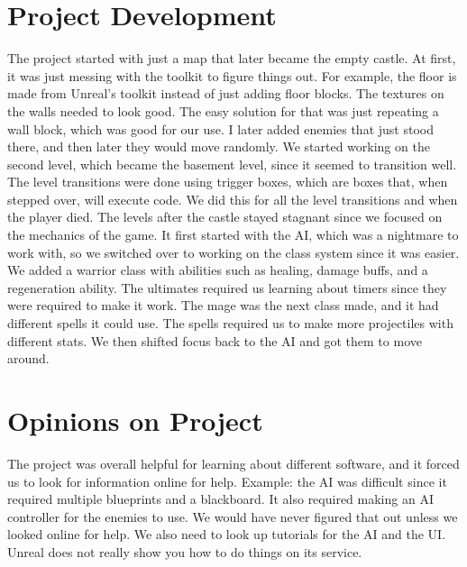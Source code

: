 \documentclass{sigchi}
\begin{document}
\section{Project Development}
The project started with just a map that later became the empty castle. At first, it was just messing with the toolkit to figure things out. For example, the floor is made from Unreal's toolkit instead of just adding floor blocks. The textures on the walls needed to look good. The easy solution for that was just repeating a wall block, which was good for our use. I later added enemies that just stood there, and then later they would move randomly. We started working on the second level, which became the basement level, since it seemed to transition well. The level transitions were done using trigger boxes, which are boxes that, when stepped over, will execute code. We did this for all the level transitions and when the player died. The levels after the castle stayed stagnant since we focused on the mechanics of the game. It first started with the AI, which was a nightmare to work with, so we switched over to working on the class system since it was easier. We added a warrior class with abilities such as healing, damage buffs, and a regeneration ability. The ultimates required us learning about timers since they were required to make it work. The mage was the next class made, and it had different spells it could use. The spells required us to make more projectiles with different stats. We then shifted focus back to the AI and got them to move around.


\section{Opinions on Project}
The project was overall helpful for learning about different software, and it forced us to look for information online for help. Example: the AI was difficult since it required multiple blueprints and a blackboard. It also required making an AI controller for the enemies to use. We would have never figured that out unless we looked online for help. We also need to look up tutorials for the AI and the UI. Unreal does not really show you how to do things on its service.
\end{document}
